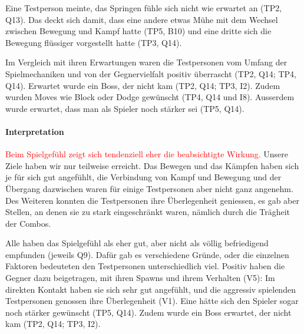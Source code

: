 \documentclass[../Main.tex]{subfiles}
\begin{document}
Eine Testperson meinte, das Springen fühle sich nicht wie erwartet an (TP2, Q13). Das deckt sich damit, dass eine andere etwas Mühe mit dem Wechsel zwischen Bewegung und Kampf hatte (TP5, B10) und eine dritte sich die Bewegung flüssiger vorgestellt hatte (TP3, Q14).

Im Vergleich mit ihren Erwartungen waren die Testpersonen vom Umfang der Spielmechaniken und von der Gegnervielfalt positiv überrascht (TP2, Q14; TP4, Q14). Erwartet wurde ein Boss, der nicht kam (TP2, Q14; TP3, I2). Zudem wurden Moves wie Block oder Dodge gewünscht (TP4, Q14 und I8). Ausserdem wurde erwartet, dass man als Spieler noch stärker sei (TP5, Q14).

\paragraph{Interpretation}
\textcolor{red}{Beim Spielgefühl zeigt sich tendenziell eher die beabsichtigte Wirkung.} Unsere Ziele haben wir nur teilweise erreicht. Das Bewegen und das Kämpfen haben sich je für sich gut angefühlt, die Verbindung von Kampf und Bewegung und der Übergang dazwischen waren für einige Testpersonen aber nicht ganz angenehm. Des Weiteren konnten die Testpersonen ihre Überlegenheit geniessen, es gab aber Stellen, an denen sie zu stark eingeschränkt waren, nämlich durch die Trägheit der Combos.

Alle haben das Spielgefühl als eher gut, aber nicht als völlig befriedigend empfunden (jeweils Q9). Dafür gab es verschiedene Gründe, oder die einzelnen Faktoren bedeuteten den Testpersonen unterschiedlich viel. Positiv haben die Gegner dazu beigetragen, mit ihren Spawns und ihrem Verhalten (V5): Im direkten Kontakt haben sie sich sehr gut angefühlt, und die aggressiv spielenden Testpersonen genossen ihre Überlegenheit (V1). Eine hätte sich den Spieler sogar noch stärker gewünscht (TP5, Q14). Zudem wurde ein Boss erwartet, der nicht kam (TP2, Q14; TP3, I2).
\end{document}
